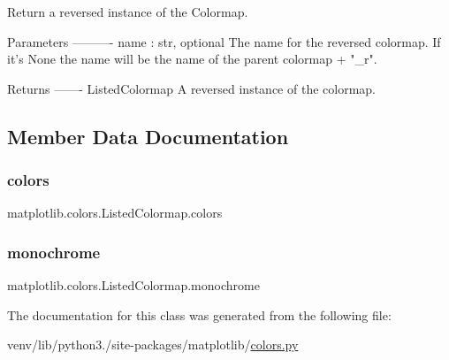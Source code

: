 \begin{DoxyVerb}Return a reversed instance of the Colormap.

Parameters
----------
name : str, optional
    The name for the reversed colormap. If it's None the
    name will be the name of the parent colormap + "_r".

Returns
-------
ListedColormap
    A reversed instance of the colormap.
\end{DoxyVerb}
 

\subsection{Member Data Documentation}
\mbox{\label{classmatplotlib_1_1colors_1_1ListedColormap_a5b2b5608ce664672fd9a2da21ee3de3d}} 
\subsubsection{\texorpdfstring{colors}{colors}}
{\footnotesize\ttfamily matplotlib.\+colors.\+Listed\+Colormap.\+colors}

\mbox{\label{classmatplotlib_1_1colors_1_1ListedColormap_a3c360f0c566a67e2836aa838e776ad48}} 
\subsubsection{\texorpdfstring{monochrome}{monochrome}}
{\footnotesize\ttfamily matplotlib.\+colors.\+Listed\+Colormap.\+monochrome}



The documentation for this class was generated from the following file\+:\begin{DoxyCompactItemize}
\item 
venv/lib/python3./site-\/packages/matplotlib/\hyperlink{colors_8py}{colors.\+py}\end{DoxyCompactItemize}
